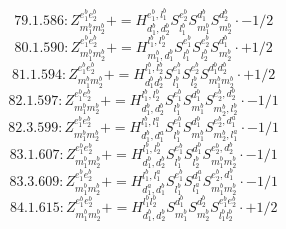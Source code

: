 \documentclass[letterpaper,10pt,fleqn,leqno,onecolumn]{article}
\begin{document}
\begin{equation} \;\;\;\;\;\;  79.1.586: Z^{e_{1}^{b}e_{2}^{b}}_{m_{1}^{b}m_{2}^{b}}+=H^{e_{1}^{b},l_{1}^{b}}_{d_{1}^{b},d_{2}^{b}}S^{e_{2}^{b}}_{l_{1}^{b}}S^{d_{1}^{b}}_{m_{1}^{b}}S^{d_{2}^{b}}_{m_{2}^{b}}\cdot -1/2 \end{equation}
\begin{equation} \;\;\;\;\;\;  80.1.590: Z^{e_{1}^{b}e_{2}^{b}}_{m_{1}^{b}m_{2}^{b}}+=H^{l_{1}^{b},l_{2}^{b}}_{m_{1}^{b},d_{1}^{b}}S^{e_{1}^{b}}_{l_{1}^{b}}S^{e_{2}^{b}}_{l_{2}^{b}}S^{d_{1}^{b}}_{m_{2}^{b}}\cdot +1/2 \end{equation}
\begin{equation} \;\;\;\;\;\;  81.1.594: Z^{e_{1}^{b}e_{2}^{b}}_{m_{1}^{b}m_{2}^{b}}+=H^{l_{1}^{b},l_{2}^{b}}_{d_{1}^{b}d_{2}^{b}}S^{e_{1}^{b}}_{l_{1}^{b}}S^{e_{2}^{b}}_{l_{2}^{b}}S^{d_{1}^{b}d_{2}^{b}}_{m_{1}^{b}m_{2}^{b}}\cdot +1/2 \end{equation}
\begin{equation} \;\;\;\;\;\;  82.1.597: Z^{e_{1}^{b}e_{2}^{b}}_{m_{1}^{b}m_{2}^{b}}+=H^{l_{1}^{b},l_{2}^{b}}_{d_{1}^{b},d_{2}^{b}}S^{e_{1}^{b}}_{l_{1}^{b}}S^{d_{1}^{b}}_{m_{1}^{b}}S^{e_{2}^{b},d_{2}^{b}}_{m_{2}^{b},l_{2}^{b}}\cdot -1/1 \end{equation}
\begin{equation} \;\;\;\;\;\;  82.3.599: Z^{e_{1}^{b}e_{2}^{b}}_{m_{1}^{b}m_{2}^{b}}+=H^{l_{1}^{b},l_{1}^{a}}_{d_{1}^{b},d_{1}^{a}}S^{e_{1}^{b}}_{l_{1}^{b}}S^{d_{1}^{b}}_{m_{1}^{b}}S^{e_{2}^{b},d_{1}^{a}}_{m_{2}^{b},l_{1}^{a}}\cdot -1/1 \end{equation}
\begin{equation} \;\;\;\;\;\;  83.1.607: Z^{e_{1}^{b}e_{2}^{b}}_{m_{1}^{b}m_{2}^{b}}+=H^{l_{1}^{b},l_{2}^{b}}_{d_{1}^{b},d_{2}^{b}}S^{e_{1}^{b}}_{l_{1}^{b}}S^{d_{1}^{b}}_{l_{2}^{b}}S^{e_{2}^{b},d_{2}^{b}}_{m_{1}^{b}m_{2}^{b}}\cdot -1/1 \end{equation}
\begin{equation} \;\;\;\;\;\;  83.3.609: Z^{e_{1}^{b}e_{2}^{b}}_{m_{1}^{b}m_{2}^{b}}+=H^{l_{1}^{b},l_{1}^{a}}_{d_{1}^{a},d_{1}^{b}}S^{e_{1}^{b}}_{l_{1}^{b}}S^{d_{1}^{a}}_{l_{1}^{a}}S^{e_{2}^{b},d_{1}^{b}}_{m_{1}^{b}m_{2}^{b}}\cdot -1/1 \end{equation}
\begin{equation} \;\;\;\;\;\;  84.1.615: Z^{e_{1}^{b}e_{2}^{b}}_{m_{1}^{b}m_{2}^{b}}+=H^{l_{1}^{b}l_{2}^{b}}_{d_{1}^{b},d_{2}^{b}}S^{d_{1}^{b}}_{m_{1}^{b}}S^{d_{2}^{b}}_{m_{2}^{b}}S^{e_{1}^{b}e_{2}^{b}}_{l_{1}^{b}l_{2}^{b}}\cdot +1/2 \end{equation}
\end{document}
